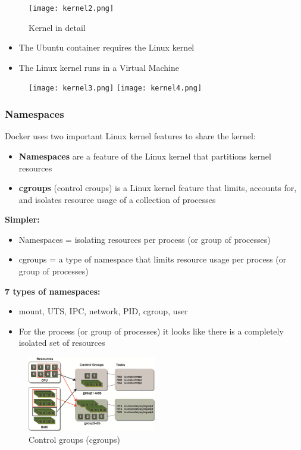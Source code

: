 \documentclass{article}
\newcommand{\bold}[1]{\textbf{#1}}
\begin{document}
\begin{figure}[H]
    \centering
    \texttt{[image: kernel2.png]}
    \caption{Kernel in detail}
\end{figure}

\begin{itemize}
    \item The Ubuntu container requires the Linux kernel
    \item The Linux kernel runs in a Virtual Machine
\end{itemize}

\begin{figure}[H]
    \centering
    \texttt{[image: kernel3.png]}
    \texttt{[image: kernel4.png]}
    \caption{}
\end{figure}

\subsubsection{Namespaces}

Docker uses two important Linux kernel features to share the kernel:

\begin{itemize}
    \item \bold{Namespaces} are a feature of the Linux kernel that partitions kernel resources
    \item \bold{cgroups} (control croups) is a Linux kernel feature that limits, accounts for, and isolates resource usage of a collection of processes 
\end{itemize}

\textbf{Simpler:}

\begin{itemize}
    \item Namespaces = isolating resources per process (or group of processes)
    \item cgroups = a type of namespace that limits resource usage per process (or group of processes)
\end{itemize}

\textbf{7 types of namespaces:}

\begin{itemize}
    \item mount, UTS, IPC, network, PID, cgroup, user
    \item For the process (or group of processes) it looks like there is a completely isolated set of resources
\end{itemize}

\begin{figure}[H]
    \centering
    \includegraphics[width=0.5\textwidth]{cgroups.png}
    \caption{Control groups (cgroups)}
\end{figure}
\end{document}
